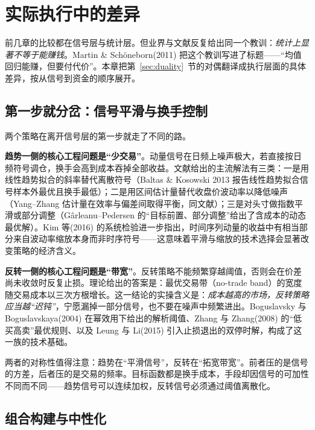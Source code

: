 \section{实际执行中的差异}\label{sec:execution}

前几章的比较都在信号层与统计层。但业界与文献反复给出同一个教训：\emph{统计上显著不等于能赚钱}。Martin \& Sch\"oneborn(2011) 把这个教训写进了标题——“均值回归能赚，但要付代价”\cite{martin2011}。本章把第~\ref{sec:duality}~节的对偶翻译成执行层面的具体差异，按从信号到资金的顺序展开。

\subsection{第一步就分岔：信号平滑与换手控制}

两个策略在离开信号层的第一步就走了不同的路。

\textbf{趋势一侧的核心工程问题是“少交易”}。动量信号在日频上噪声极大，若直接按日频符号调仓，换手会高到成本吞掉全部收益。文献给出的主流解法有三类：一是用线性趋势拟合的斜率替代离散符号（Baltas \& Kosowski 2013 报告线性趋势拟合信号样本外最优且换手最低\cite{baltaskosowski2013imp}）；二是用区间估计量替代收盘价波动率以降低噪声（Yang--Zhang 估计量在效率与偏差间取得平衡，同文献）；三是对头寸做指数平滑或部分调整（Gârleanu--Pedersen 的“目标前置、部分调整”给出了含成本的动态最优解\cite{garleanu2013}）。Kim 等(2016) 的系统检验进一步指出，时间序列动量的收益中有相当部分来自波动率缩放本身而非时序符号\cite{kim2016}——这意味着平滑与缩放的技术选择会显著改变策略的经济含义。

\textbf{反转一侧的核心工程问题是“带宽”}。反转策略不能频繁穿越阈值，否则会在价差尚未收敛时反复止损。理论给出的答案是：最优交易带（no-trade band）的宽度随交易成本以三次方根增长\cite{martin2011}。这一结论的实操含义是：\emph{成本越高的市场，反转策略应当越“迟钝”}，宁愿漏掉一部分信号，也不要在噪声中频繁进出。Boguslavsky 与 Boguslavskaya(2004) 在幂效用下给出的解析阈值\cite{boguslavsky2004}、Zhang 与 Zhang(2008) 的“低买高卖”最优规则\cite{zhangzhang2008}、以及 Leung 与 Li(2015) 引入止损退出的双停时解\cite{leungli2015}，构成了这一族的技术基础。

两者的对称性值得注意：趋势在“平滑信号”，反转在“拓宽带宽”。前者压的是信号的方差，后者压的是交易的频率。目标函数都是换手成本，手段却因信号的可加性不同而不同——趋势信号可以连续加权，反转信号必须通过阈值离散化。

\subsection{组合构建与中性化}

